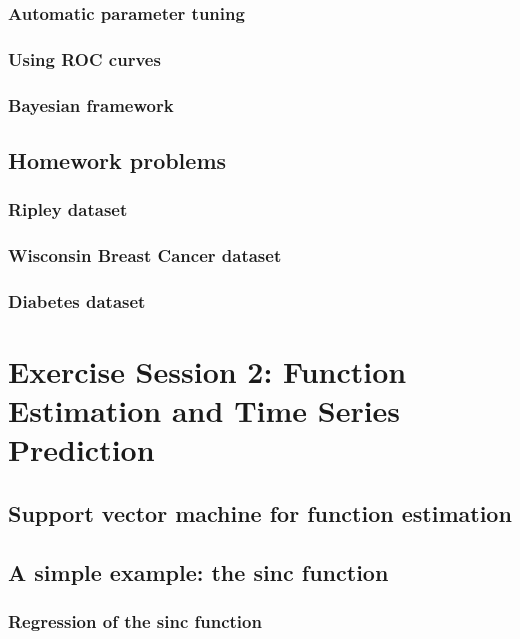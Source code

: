 \documentclass{article}
\begin{document}
        \subsubsection{Automatic parameter tuning}
    
        \subsubsection{Using ROC curves}
        
        \subsubsection{Bayesian framework} 
        
    \subsection{Homework problems}
        \subsubsection{Ripley dataset} 
        
        \subsubsection{Wisconsin Breast Cancer dataset}
        
        \subsubsection{Diabetes dataset}

\newpage
\section{Exercise Session 2: Function Estimation and Time Series Prediction} 
    \subsection{Support vector machine for function estimation} 
    
    \subsection{A simple example: the sinc function}
    
        \subsubsection{Regression of the sinc function}
        
\end{document}
